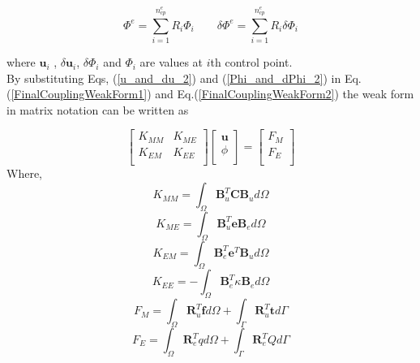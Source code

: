 \documentclass[11pt]{article}
\begin{document}
\begin{equation} \label{Phi_and_dPhi_2}
\Phi^e = \sum_{i=1}^{n_{cp}^e} R_i \Phi_i \qquad \delta\Phi^e =
\sum_{i=1}^{n_{cp}^e} R_i \delta\Phi_i
\end{equation}

\noindent
where $\textbf{u}_i$ , $\delta\textbf{u}_i$, $\delta\Phi_i$ and $\Phi_i$ are
values at $i$th control point.\\
By substituting Eqs, (\ref{u_and_du_2}) and (\ref{Phi_and_dPhi_2}) in
Eq.(\ref{FinalCouplingWeakForm1}) and Eq.(\ref{FinalCouplingWeakForm2}) the weak
form in matrix notation can be written as

\begin{equation} \label{CoupledStiffnessMatrix}
\begin{bmatrix} 
K_{MM} & K_{ME} \\
K_{EM} & K_{EE} \\ 
\end{bmatrix}
\begin{bmatrix} 
\textbf{u} \\
\phi \\ 
\end{bmatrix} = \begin{bmatrix} 
F_M \\
F_E \\ 
\end{bmatrix}
\end{equation}  
Where,
\begin{equation}
K_{MM} = \int_\Omega \textbf{B}_u^T \textbf{C} \textbf{B}_u d\Omega
\end{equation}
\begin{equation}
K_{ME} = \int_\Omega \textbf{B}_u^T \textbf{e} \textbf{B}_e d\Omega
\end{equation}
\begin{equation}
K_{EM} = \int_\Omega \textbf{B}_e^T \textbf{e}^T \textbf{B}_u d\Omega
\end{equation}
\begin{equation}
K_{EE} = - \int_\Omega \textbf{B}_e^T \kappa \textbf{B}_e d\Omega
\end{equation}
\begin{equation}
F_M = \int_\Omega \textbf{R}_u^T \textbf{f} d\Omega + \int_\Gamma \textbf{R}_u^T
\textbf{t} d\Gamma 
\end{equation}
\begin{equation}
F_E = \int_\Omega \textbf{R}_e^T q d\Omega + \int_\Gamma \textbf{R}_e^T Q
d\Gamma 
\end{equation}
\end{document}
